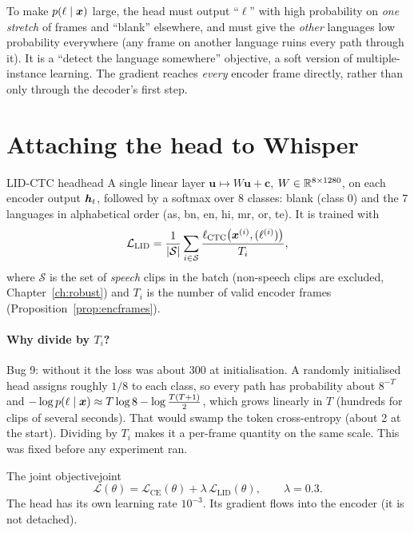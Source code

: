 \begin{intuition}
To make $p(\ell\mid\bm{x})$ large, the head must output ``$\ell$'' with high probability on \emph{one stretch} of frames and ``blank''
elsewhere, and must give the \emph{other} languages low probability everywhere (any frame on another language ruins every path
through it). It is a ``detect the language somewhere'' objective, a soft version of multiple-instance learning. The gradient reaches
\emph{every} encoder frame directly, rather than only through the decoder's first step.
\end{intuition}

\section{Attaching the head to Whisper}

\begin{definition}{LID-CTC head}{head}
A single linear layer $\bm u\mapsto W\bm u+\bm c$, $W\in\mathbb{R}^{8\times1280}$, on each encoder output $\bm{h}_t$, followed by a softmax over
8 classes: blank (class 0) and the 7 languages in alphabetical order (as, bn, en, hi, mr, or, te). It is trained with
\[
\mathcal L_{\text{LID}}=\frac{1}{|\mathcal S|}\sum_{i\in\mathcal S}\frac{\ell_{\text{CTC}}\big(\bm{x}^{(i)},(\ell^{(i)})\big)}{T_i},
\]
where $\mathcal S$ is the set of \emph{speech} clips in the batch (non-speech clips are excluded, Chapter~\ref{ch:robust}) and
$T_i$ is the number of valid encoder frames (Proposition~\ref{prop:encframes}).
\end{definition}

\paragraph{Why divide by $T_i$?} Bug 9: without it the loss was about 300 at initialisation. A randomly initialised head assigns
roughly $1/8$ to each class, so every path has probability about $8^{-T}$ and $-\log p(\ell\mid\bm{x})\approx T\log 8-\log\frac{T(T+1)}2$,
which grows linearly in $T$ (hundreds for clips of several seconds). That would swamp the token cross-entropy (about 2 at the
start). Dividing by $T_i$ makes it a per-frame quantity on the same scale. This was fixed before any experiment ran.

\begin{definition}{The joint objective}{joint}
\[
\mathcal L(\theta)=\mathcal L_{\text{CE}}(\theta)+\lambda\,\mathcal L_{\text{LID}}(\theta),\qquad\lambda=0.3 .
\]
The head has its own learning rate $10^{-3}$. Its gradient flows into the encoder (it is not detached).
\end{definition}

